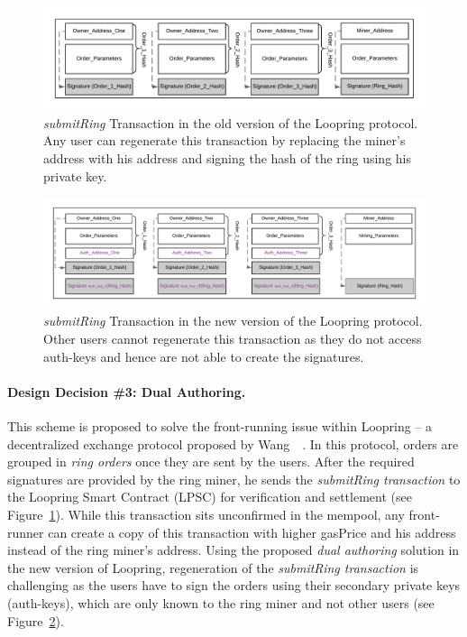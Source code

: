 \begin{figure}[t]
\centering
\includegraphics[width=0.9\linewidth]{figures/Vulnerable_Loopring.png}
\caption{\scriptsize \emph{submitRing} Transaction in the old version of the Loopring protocol. Any user can regenerate this transaction by replacing the miner's address with his address and signing the hash of the ring using his private key. \label{fig:vulnerable_loopring}}
\end{figure}
\begin{figure}[t]
\centering
\includegraphics[width=0.7\linewidth]{figures/Dual_Authoring_Loopring.png}
\caption{\scriptsize \emph{submitRing} Transaction in the new version of the Loopring protocol. Other users cannot regenerate this transaction as they do not access auth-keys and hence are not able to create the signatures. \label{fig:not_vulnerable_loopring}}
\end{figure}


\paragraph{Design Decision \#3: Dual Authoring.} This scheme is proposed to solve the front-running issue within Loopring -- a decentralized exchange protocol proposed by Wang~\etal~\cite{wang2018loopring}. In this protocol, orders are grouped in \emph{ring orders} once they are sent by the users. After the required signatures are provided by the ring miner, he sends the \emph{submitRing transaction} to the Loopring Smart Contract (LPSC) for verification and settlement (see Figure~\ref{fig:vulnerable_loopring}). While this transaction sits unconfirmed in the mempool, any front-runner can create a copy of this transaction with higher gasPrice and his address instead of the ring miner's address. Using the proposed \textit{dual authoring} solution in the new version of Loopring, regeneration of the \emph{submitRing transaction} is challenging as the users have to sign the orders using their secondary private keys (auth-keys), which are only known to the ring miner and not other users (see Figure~\ref{fig:not_vulnerable_loopring}).


